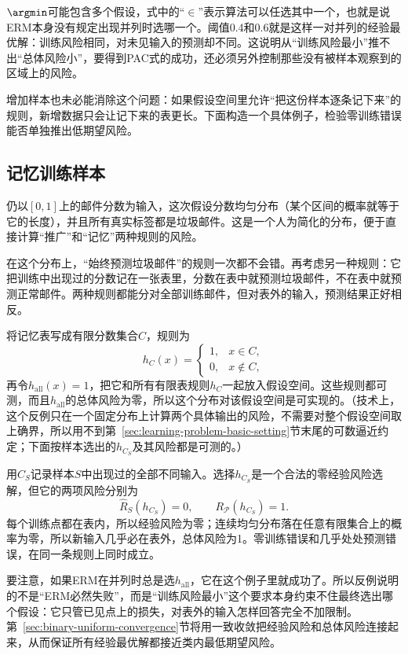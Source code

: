 $\argmin$可能包含多个假设，式中的“$\in$”表示算法可以任选其中一个，也就是说ERM本身没有规定出现并列时选哪一个。阈值0.4和0.6就是这样一对并列的经验最优解：训练风险相同，对未见输入的预测却不同。这说明从“训练风险最小”推不出“总体风险小”，要得到PAC式的成功，还必须另外控制那些没有被样本观察到的区域上的风险。

增加样本也未必能消除这个问题：如果假设空间里允许“把这份样本逐条记下来”的规则，新增数据只会让记下来的表更长。下面构造一个具体例子，检验零训练错误能否单独推出低期望风险。

\subsection{记忆训练样本}

仍以$[0,1]$上的邮件分数为输入，这次假设分数均匀分布（某个区间的概率就等于它的长度），并且所有真实标签都是垃圾邮件。这是一个人为简化的分布，便于直接计算“推广”和“记忆”两种规则的风险。

在这个分布上，“始终预测垃圾邮件”的规则一次都不会错。再考虑另一种规则：它把训练中出现过的分数记在一张表里，分数在表中就预测垃圾邮件，不在表中就预测正常邮件。两种规则都能分对全部训练邮件，但对表外的输入，预测结果正好相反。

将记忆表写成有限分数集合$C$，规则为
\begin{equation}
  h_C(x)=
  \begin{cases}
    1, & x\in C,\\
    0, & x\notin C,
  \end{cases}
  \label{eq:finite-memory-classifier}
\end{equation}
再令$h_{\mathrm{all}}(x)=1$，把它和所有有限表规则$h_C$一起放入假设空间。这些规则都可测，而且$h_{\mathrm{all}}$的总体风险为零，所以这个分布对该假设空间是可实现的。（技术上，这个反例只在一个固定分布上计算两个具体输出的风险，不需要对整个假设空间取上确界，所以用不到第~\ref{sec:learning-problem-basic-setting}节末尾的可数逼近约定；下面按样本选出的$h_{C_S}$及其风险都是可测的。）

用$C_S$记录样本$S$中出现过的全部不同输入。选择$h_{C_S}$是一个合法的零经验风险选解，但它的两项风险分别为
\begin{equation}
  \hat R_S(h_{C_S})=0,
  \qquad
  R_{\mathcal P}(h_{C_S})=1.
  \label{eq:memorization-erm-failure}
\end{equation}
每个训练点都在表内，所以经验风险为零；连续均匀分布落在任意有限集合上的概率为零，所以新输入几乎必在表外，总体风险为1。零训练错误和几乎处处预测错误，在同一条规则上同时成立。

要注意，如果ERM在并列时总是选$h_{\mathrm{all}}$，它在这个例子里就成功了。所以反例说明的不是“ERM必然失败”，而是“训练风险最小”这个要求本身约束不住最终选出哪个假设：它只管已见点上的损失，对表外的输入怎样回答完全不加限制。第~\ref{sec:binary-uniform-convergence}节将用一致收敛把经验风险和总体风险连接起来，从而保证所有经验最优解都接近类内最低期望风险。

